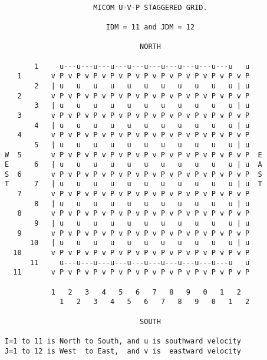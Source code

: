 \pagebreak
{\tt
\begin{verbatim}
                     MICOM U-V-P STAGGERED GRID.

                        IDM = 11 and JDM = 12

                                NORTH

       1     u---u---u---u---u---u---u---u---u---u---u   u
   1       v P v P v P v P v P v P v P v P v P v P v P v P
       2   | u   u   u   u   u   u   u   u   u   u   u | u
   2       v P v P v P v P v P v P v P v P v P v P v P v P
       3   | u   u   u   u   u   u   u   u   u   u   u | u
   3       v P v P v P v P v P v P v P v P v P v P v P v P
       4   | u   u   u   u   u   u   u   u   u   u   u | u
   4       v P v P v P v P v P v P v P v P v P v P v P v P
       5   | u   u   u   u   u   u   u   u   u   u   u | u
W  5       v P v P v P v P v P v P v P v P v P v P v P v P  E
E      6   | u   u   u   u   u   u   u   u   u   u   u | u  A
S  6       v P v P v P v P v P v P v P v P v P v P v P v P  S
T      7   | u   u   u   u   u   u   u   u   u   u   u | u  T
   7       v P v P v P v P v P v P v P v P v P v P v P v P
       8   | u   u   u   u   u   u   u   u   u   u   u | u
   8       v P v P v P v P v P v P v P v P v P v P v P v P
       9   | u   u   u   u   u   u   u   u   u   u   u | u
   9       v P v P v P v P v P v P v P v P v P v P v P v P
      10   | u   u   u   u   u   u   u   u   u   u   u | u
  10       v P v P v P v P v P v P v P v P v P v P v P v P
      11     u---u---u---u---u---u---u---u---u---u---u   u
  11       v P v P v P v P v P v P v P v P v P v P v P v P
 
           1   2   3   4   5   6   7   8   9   0   1   2
             1   2   3   4   5   6   7   8   9   0   1   2

                                SOUTH

I=1 to 11 is North to South, and u is southward velocity
J=1 to 12 is West  to East,  and v is  eastward velocity
\end{verbatim}
}


